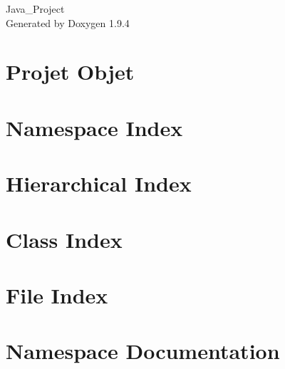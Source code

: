 \documentclass[twoside]{book}
\newcommand{\+}{\discretionary{\mbox{\scriptsize$\hookleftarrow$}}{}{}}
\newcommand{\clearemptydoublepage}{%
    \newpage{\pagestyle{empty}\cleardoublepage}%
  }
\begin{document}
  \raggedbottom
    \hypersetup{pageanchor=false,
                bookmarksnumbered=true,
                pdfencoding=unicode
               }
  \begin{titlepage}
  \vspace*{7cm}
  \begin{center}%
  {\Large Java\+\_\+\+Project}\\
  \vspace*{1cm}
  {\large Generated by Doxygen 1.9.4}\\
  \end{center}
  \end{titlepage}
  \clearemptydoublepage
  \tableofcontents
  \clearemptydoublepage
  \hypersetup{pageanchor=true}
\chapter{Projet Objet}
\label{md__r_e_a_d_m_e}

\chapter{Namespace Index}

\chapter{Hierarchical Index}

\chapter{Class Index}

\chapter{File Index}

\chapter{Namespace Documentation}










\end{document}
